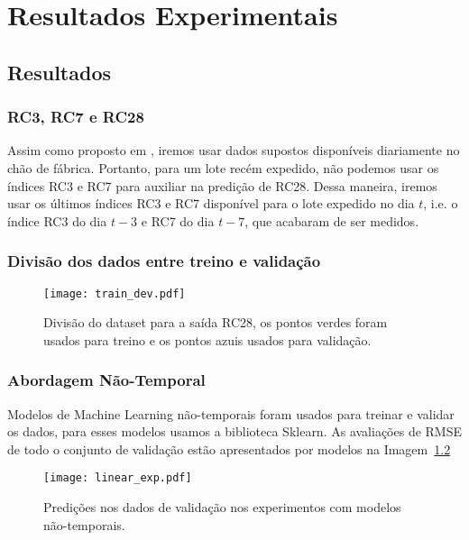 \chapter{Resultados Experimentais }
\label{cap:resultados}

\section{Resultados}


\subsection{RC3, RC7 e RC28}

Assim como proposto em \cite{greciaLin}, iremos usar dados supostos disponíveis diariamente no chão de fábrica. Portanto, para um lote recém expedido,
não podemos usar os índices RC3 e RC7 para auxiliar na predição de RC28. Dessa maneira, iremos usar os últimos índices RC3 e RC7 disponível para o lote expedido no dia $t$,
i.e. o índice RC3 do dia $t-3$ e RC7 do dia $t-7$, que acabaram de ser medidos. 

\subsection{Divisão dos dados entre treino e validação}

\begin{figure}[H]
  \centering
  \texttt{[image: train\_dev.pdf]}
  \caption{Divisão do dataset para a saída RC28, os pontos verdes foram usados para
    treino e os pontos azuis usados para validação.}
  \label{fig:divrc28}
\end{figure}

\subsection{Abordagem Não-Temporal}

Modelos de Machine Learning não-temporais foram usados para treinar e validar os dados, para esses modelos usamos a biblioteca Sklearn.
As avaliações de RMSE de todo o conjunto de validação estão apresentados por modelos na Imagem~\ref{fig:linmodels}  

\begin{figure}[H]
  \centering
  \label{fig:linmodels}
\texttt{[image: linear\_exp.pdf]}
\caption{Predições nos dados de validação nos experimentos com modelos não-temporais. }
\end{figure}

